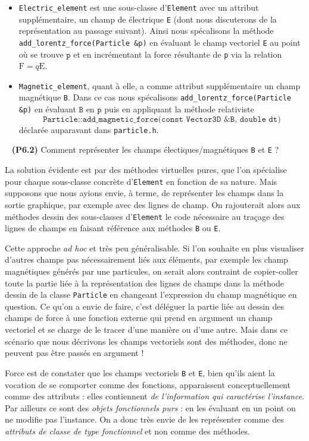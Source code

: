 \documentclass[12pt, letterpaper, twoside]{article}
\newcommand{\T}[1]{\texttt{#1}}
\begin{document}
\begin{itemize}
\item \T{Electric\_element} est une sous-classe d'\T{Element} avec un attribut supplémentaire, un champ de électrique \T{E} (dont nous discuterons de la représentation au passage suivant). Ainsi nous spécalisons la méthode \T{add\_lorentz\_force(Particle \&p)} en évaluant le champ vectoriel \T{E} au point où se trouve $\T{p}$ et en incrémentant la force résultante de \T{p} via la relation $\boldsymbol{\mathrm{F}}=q\boldsymbol{\mathrm{E}}$.

\item \T{Magnetic\_element}, quant à elle, a comme attribut supplémentaire un champ magnétique \T{B}. Dans ce cas nous spécalisons \T{add\_lorentz\_force(Particle \&p)} en évaluant $\T{B}$ en $\T{p}$ puis en appliquant la méthode relativiste $$\T{Particle::add\_magnetic\_force(const Vector3D \&B, double dt)}$$ déclarée auparavant dans \T{particle.h}.

\end{itemize}

\ \linebreak
\textbf{(P6.2)} Comment représenter les champs électiques/magnétiques \T{B} et \T{E} ?

La solution évidente est par des méthodes virtuelles pures, que l'on spécialise pour chaque sous-classe concrète d'\T{Element} en fonction de sa nature. Mais supposons que nous ayions envie, à terme, de représenter les champs dans la sortie graphique, par exemple avec des lignes de champ. On rajouterait alors aux méthodes dessin des sous-classes d'\T{Element} le code nécessaire au traçage des lignes de champs en faisant référence aux méthodes \T{B} ou \T{E}.

Cette approche \textit{ad hoc} et très peu généralisable. Si l'on souhaite en plus visualiser d'autres champs pas nécessairement liés aux éléments, par exemple les champ magnétiques générés par une particules, on serait alors contraint de copier-coller toute la partie liée à la représentation des lignes de champs dans la méthode dessin de la classe \T{Particle} en changeant l'expression du champ magnétique en question. Ce qu'on a envie de faire, c'est déléguer la partie liée au dessin des champs de force à une fonction externe qui prend en argument un champ vectoriel et se charge de le tracer d'une manière ou d'une autre. Mais dans ce scénario que nous décrivons les champs vectoriels sont des méthodes, donc ne peuvent pas être passés en argument !

Force est de constater que les champs vectoriels \T{B} et \T{E}, bien qu'ils aient la vocation de se comporter comme des fonctions, apparaissent conceptuellement comme des attributs : elles contiennent \textit{de l'information qui caractérise l'instance}. Par ailleurs ce sont des \textit{objets fonctionnels purs} : en les évaluant en un point on ne modifie pas l'instance. On a donc très envie de les représenter comme des \textit{attributs de classe de type fonctionnel} et non comme des méthodes.
\end{document}
